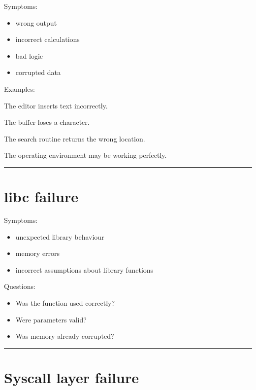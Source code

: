 \documentclass[
  oneside,
  openany]{book}
\providecommand{\tightlist}{%
  \setlength{\itemsep}{0pt}\setlength{\parskip}{0pt}}
\begin{document}
Symptoms:

\begin{itemize}
\tightlist
\item
  wrong output
\item
  incorrect calculations
\item
  bad logic
\item
  corrupted data
\end{itemize}

Examples:

The editor inserts text incorrectly.

The buffer loses a character.

The search routine returns the wrong location.

The operating environment may be working perfectly.

\begin{center}\rule{0.5\linewidth}{0.5pt}\end{center}

\hypertarget{libc-failure}{%
\section{libc failure}\label{libc-failure}}

Symptoms:

\begin{itemize}
\tightlist
\item
  unexpected library behaviour
\item
  memory errors
\item
  incorrect assumptions about library functions
\end{itemize}

Questions:

\begin{itemize}
\tightlist
\item
  Was the function used correctly?
\item
  Were parameters valid?
\item
  Was memory already corrupted?
\end{itemize}

\begin{center}\rule{0.5\linewidth}{0.5pt}\end{center}

\hypertarget{syscall-layer-failure}{%
\section{Syscall layer failure}\label{syscall-layer-failure}}
\end{document}
